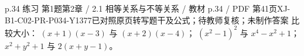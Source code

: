 \par\noindent\begin{minipage}{\linewidth}
\begin{bankitem}{p.34 练习 第1题}{第2章 / 2.1 相等关系与不等关系 / 教材 p.34 / PDF 第41页}{XJ-B1-C02-PR-P034-Y1377}{已对照原页转写题干及公式；待教师复核；未制作答案}
比较大小：
$(x+1)(x-3)$ 与 $(x+2)(x-4)$；
$(x^2-1)^2$ 与 $x^4-x^2+1$；
$x^2+y^2+1$ 与 $2(x+y-1)$。
\end{bankitem}
\end{minipage}\par\medskip
